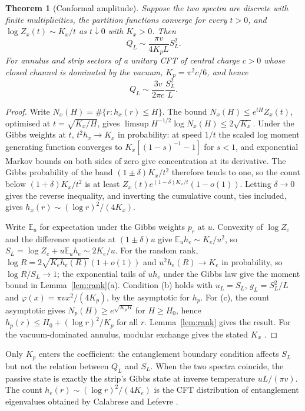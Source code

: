 \documentclass[11pt,a4paper]{article}
\newtheorem{theorem}{Theorem}
\theoremstyle{remark}
\newcommand{\E}{\mathbb E}
\begin{document}
\begin{theorem}[Conformal amplitude]\label{thm:cft}
Suppose the two spectra are discrete with finite multiplicities, the partition functions converge for every $t>0$, and $\log Z_x(t)\sim K_x/t$ as $t\downarrow0$ with $K_x>0$. Then
\[
 Q_L\sim \frac{\pi v}{4K_p L}S_L^2 .
\]
For annulus and strip sectors of a unitary CFT of central charge $c>0$ whose closed channel is dominated by the vacuum, $K_p=\pi^2 c/6$, and hence
\begin{equation}
 \boxed{\displaystyle Q_L\sim\frac{3v}{2\pi c}\frac{S_L^2}{L}.}
 \label{eq:cft}
\end{equation}
\end{theorem}
\begin{proof}
Write $N_x(H)=\#\{r:h_x(r)\le H\}$. The bound $N_x(H)\le e^{tH}Z_x(t)$, optimised at $t=\sqrt{K_x/H}$, gives $\limsup H^{-1/2}\log N_x(H)\le 2\sqrt{K_x}$. Under the Gibbs weights at $t$, $t^2 h_x\to K_x$ in probability: at speed $1/t$ the scaled log moment generating function converges to $K_x[(1-s)^{-1}-1]$ for $s<1$, and exponential Markov bounds on both sides of zero give concentration at its derivative. The Gibbs probability of the band $(1\pm\delta)K_x/t^2$ therefore tends to one, so the count below $(1+\delta)K_x/t^2$ is at least $Z_x(t)e^{(1-\delta)K_x/t}(1-o(1))$. Letting $\delta\to0$ gives the reverse inequality, and inverting the cumulative count, ties included, gives $h_x(r)\sim(\log r)^2/(4K_x)$.

Write $\E_u$ for expectation under the Gibbs weights $p_r$ at $u$. Convexity of $\log Z_e$ and the difference quotients at $(1\pm\delta)u$ give $\E_u h_e\sim K_e/u^2$, so $S_L=\log Z_e+u\E_u h_e\sim 2K_e/u$. For the random rank, $\log R=2\sqrt{K_eh_e(R)}(1+o(1))$ and $u^2h_e(R)\to K_e$ in probability, so $\log R/S_L\to1$; the exponential tails of $uh_e$ under the Gibbs law give the moment bound in Lemma~\ref{lem:rank}(a). Condition (b) holds with $u_L=S_L$, $g_L=S_L^2/L$ and $\varphi(x)=\pi vx^2/(4K_p)$, by the asymptotic for $h_p$. For (c), the count asymptotic gives $N_p(H)\ge e^{\sqrt{K_pH}}$ for $H\ge H_0$, hence $h_p(r)\le H_0+(\log r)^2/K_p$ for all $r$. Lemma~\ref{lem:rank} gives the result. For the vacuum-dominated annulus, modular exchange gives the stated $K_x$ \cite{cardy,alba}.
\end{proof}
Only $K_p$ enters the coefficient: the entanglement boundary condition affects $S_L$ but not the relation between $Q_L$ and $S_L$. When the two spectra coincide, the passive state is exactly the strip's Gibbs state at inverse temperature $uL/(\pi v)$. The count $h_e(r)\sim(\log r)^2/(4K_e)$ is the CFT distribution of entanglement eigenvalues obtained by Calabrese and Lefevre \cite{calabrese}.
\end{document}
